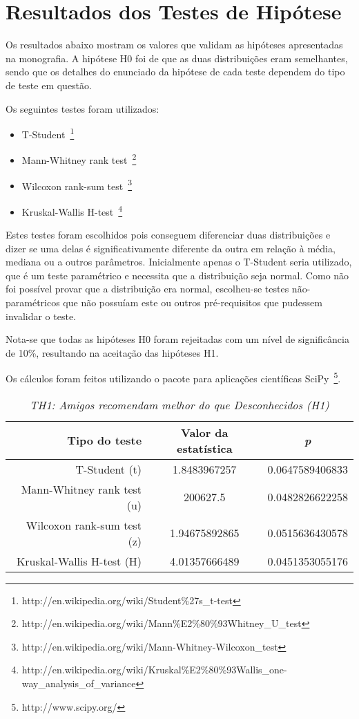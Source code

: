 \appendix
\chapter{Resultados dos Testes de Hipótese}
\label{anexo_hipoteses}

Os resultados abaixo mostram os valores que validam as hipóteses apresentadas na monografia. A hipótese H0 foi de que as duas distribuições eram semelhantes, sendo que os detalhes do enunciado da hipótese de cada teste dependem do tipo de teste em questão.

Os seguintes testes foram utilizados:

\begin{itemize}
    \item T-Student~\footnote{http://en.wikipedia.org/wiki/Student\%27s\_t-test}
    \item Mann-Whitney rank test~\footnote{http://en.wikipedia.org/wiki/Mann\%E2\%80\%93Whitney\_U\_test}
    \item Wilcoxon rank-sum test~\footnote{http://en.wikipedia.org/wiki/Mann-Whitney-Wilcoxon\_test}
    \item Kruskal-Wallis H-test~\footnote{http://en.wikipedia.org/wiki/Kruskal\%E2\%80\%93Wallis\_one-way\_analysis\_of\_variance}

\end{itemize}

Estes testes foram escolhidos pois conseguem diferenciar duas distribuições e dizer se uma delas é significativamente diferente da outra em relação à média, mediana ou a outros parâmetros. Inicialmente apenas o T-Student seria utilizado, que é um teste paramétrico e necessita que a distribuição seja normal. Como não foi possível provar que a distribuição era normal, escolheu-se testes não-paramétricos que não possuíam este ou outros pré-requisitos que pudessem invalidar o teste.

Nota-se que todas as hipóteses H0 foram rejeitadas com um nível de significância de 10\%, resultando na aceitação das hipóteses H1.

Os cálculos foram feitos utilizando o pacote para aplicações científicas SciPy~\footnote{http://www.scipy.org/}.

\begin{table}
\centering
\begin{tabular}{|r|c|c|}
    \hline
    \textbf{Tipo do teste} & \textbf{Valor da estatística} & \textbf{\textit{p}} \\
    \hline
T-Student (t) & 1.8483967257 & 0.0647589406833 \\
\hline 
Mann-Whitney rank test (u) & 200627.5 & 0.0482826622258 \\
\hline 
Wilcoxon rank-sum test (z) & 1.94675892865 & 0.0515636430578 \\
\hline 
Kruskal-Wallis H-test (H) & 4.01357666489 & 0.0451353055176 \\
\hline 

\end{tabular}
\caption{\it TH1: Amigos recomendam melhor do que Desconhecidos (H1)}
\end{table}



